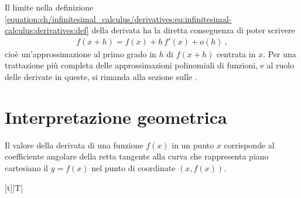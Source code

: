 \documentclass[letterpaper,10pt,italian]{jupyterBook}
\begin{document}
\sphinxAtStartPar
Il limite nella definizione \eqref{equation:ch/infinitesimal_calculus/derivatives:eq:infinitesimal-calculus:derivatives:def} della derivata ha la diretta conseguenza di poter scrivere
\begin{equation}\label{equation:ch/infinitesimal_calculus/derivatives:eq:infinitesimal-calculus:derivative:def_expansion}
\begin{split}f(x+h) = f(x) + h \, f'(x) + o(h) \ ,\end{split}
\end{equation}
\sphinxAtStartPar
cioè un’approssimazione al primo grado in \(h\) di \(f(x+h)\) centrata in \(x\). Per una trattazione più completa delle approssimazioni polinomiali di funzioni, e al ruolo delle derivate in queste, si rimanda alla sezione sulle {\hyperref[\detokenize{ch/infinitesimal_calculus/derivatives:infinitesimal-calculus-derivatives-taylor}]{}}.


\section{Interpretazione geometrica}
\label{\detokenize{ch/infinitesimal_calculus/derivatives:interpretazione-geometrica}}\label{\detokenize{ch/infinitesimal_calculus/derivatives:infinitesimal-calculus-derivatives-geom}}
\sphinxAtStartPar
Il valore della derivata di una funzione \(f(x)\) in un punto \(x\) corrisponde al coefficiente angolare della retta tangente alla curva che rappresenta piano cartesiano il {\hyperref[\detokenize{ch/precalculus/real-functions:math-hs-precalculus-real-functions-inverse-plot}]{}} \(y=f(x)\) nel punto di coordinate \((x,f(x))\).


\begin{savenotes}\sphinxattablestart
\centering
\begin{tabulary}{\linewidth}[t]{|T|}
\hline

\sphinxAtStartPar
{}
\\
\hline
\end{tabulary}
\par
\sphinxattableend\end{savenotes}
\end{document}
